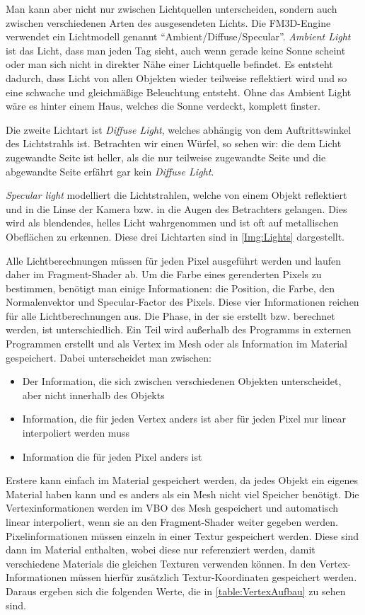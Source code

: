 Man kann aber nicht nur zwischen Lichtquellen unterscheiden, sondern auch zwischen verschiedenen Arten des ausgesendeten Lichts. Die \ac{FM3D}-Engine verwendet ein Lichtmodell genannt "`Ambient/Diffuse/Specular"'. 
\textit{Ambient Light} ist das Licht, dass man jeden Tag sieht, auch wenn gerade keine Sonne scheint oder man sich nicht in direkter Nähe einer Lichtquelle befindet. 
Es entsteht dadurch, dass Licht von allen Objekten wieder teilweise reflektiert wird und so eine schwache und gleichmäßige Beleuchtung entsteht. Ohne das Ambient Light wäre es hinter einem Haus, welches die Sonne verdeckt, komplett finster. 

Die zweite Lichtart ist \textit{Diffuse Light}, welches abhängig von dem Auftrittswinkel des Lichtstrahls ist. Betrachten wir einen Würfel, so sehen wir: 
die dem Licht zugewandte Seite ist heller, als die nur teilweise zugewandte Seite und die abgewandte Seite erfährt gar kein \textit{Diffuse Light}. 

\textit{Specular light} modelliert die Lichtstrahlen, welche von einem Objekt reflektiert und in die Linse der Kamera bzw. in die Augen des Betrachters gelangen. Dies wird als blendendes, helles Licht wahrgenommen und ist oft auf metallischen Obeflächen zu erkennen. Diese drei Lichtarten sind in \cref{Img:Lights} dargestellt.

Alle Lichtberechnungen müssen für jeden Pixel ausgeführt werden und laufen daher im Fragment-Shader ab.
Um die Farbe eines gerenderten Pixels zu bestimmen, benötigt man einige Informationen: die Position, die Farbe, den Normalenvektor und Specular-Factor des Pixels. Diese vier Informationen reichen für alle Lichtberechnungen aus. Die Phase, in der sie erstellt bzw. berechnet werden, ist unterschiedlich. Ein Teil wird außerhalb des Programms in externen Programmen erstellt und als Vertex im Mesh oder als Information im Material gespeichert. Dabei unterscheidet man zwischen:
\begin{itemize}
	\item Der Information, die sich zwischen verschiedenen Objekten unterscheidet, aber nicht innerhalb des Objekts
	\item Information, die für jeden Vertex anders ist aber für jeden Pixel nur linear interpoliert werden muss
	\item Information die für jeden Pixel anders ist
\end{itemize}

Erstere kann einfach im Material gespeichert werden, da jedes Objekt ein eigenes Material haben kann und es anders als ein Mesh nicht viel Speicher benötigt. Die Vertexinformationen werden im \ac{VBO} des Mesh gespeichert und automatisch linear interpoliert, wenn sie an den Fragment-Shader weiter gegeben werden. Pixelinformationen müssen einzeln in einer Textur gespeichert werden. Diese sind dann im Material enthalten, wobei diese nur referenziert werden, damit verschiedene Materials die gleichen Texturen verwenden können. In den Vertex-Informationen müssen hierfür zusätzlich Textur-Koordinaten gespeichert werden. Daraus ergeben sich die folgenden Werte, die in \cref{table:VertexAufbau} zu sehen sind.

